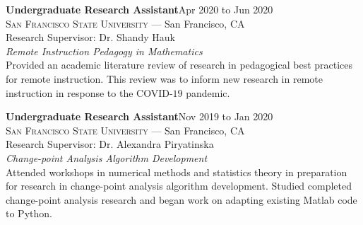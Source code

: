 \documentclass[hidelinks, 10pt]{article}
\def\contentwidth{0.9\linewidth}    %
\def\contentblockspacing{2.5mm}     %
\def\contentheaderspacing{1mm}      %
\begin{document}
{%

\begin{minipage}[ct]{\contentwidth}
    \textbf{Undergraduate Research Assistant}\hfill Apr 2020 to Jun 2020\\
    \textsc{San Francisco State University} --- San Francisco, CA\\
    Research Supervisor: Dr. Shandy Hauk
    \vspace{\contentheaderspacing}\\
    {\textit{Remote Instruction Pedagogy in Mathematics}}\\
    Provided an academic literature review of research in pedagogical best practices for remote instruction.  This review was to inform
    new research in remote instruction in response to the COVID-$19$ pandemic.
\end{minipage}

\vspace{\contentblockspacing}


\begin{minipage}[ct]{\contentwidth}
    \textbf{Undergraduate Research Assistant}\hfill Nov 2019 to Jan 2020\\
    \textsc{San Francisco State University} --- San Francisco, CA\\
    Research Supervisor: Dr. Alexandra Piryatinska
    \vspace{\contentheaderspacing}\\
    {\textit{Change-point Analysis Algorithm Development}}\\
    Attended workshops in numerical methods and statistics theory in preparation for research in change-point analysis algorithm
    development.  Studied completed change-point analysis research and began work on adapting existing Matlab code to Python.
\end{minipage}

}
\end{document}
